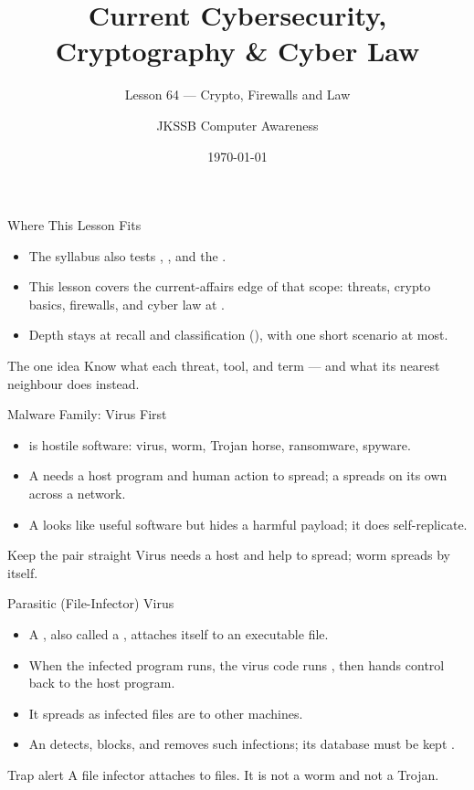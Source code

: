 \documentclass[aspectratio=169]{beamer}
\title{Current Cybersecurity, Cryptography \& Cyber Law}
\subtitle{Lesson 64 --- Crypto, Firewalls and Law}
\author{JKSSB Computer Awareness}
\date{\today}
\begin{document}
\frame{\titlepage}

\begin{frame}{Where This Lesson Fits}
  \begin{itemize}
    \item The syllabus also tests ,
      , and the .
    \item This lesson covers the current-affairs edge of that scope: threats,
      crypto basics, firewalls, and cyber law at .
    \item Depth stays at recall and classification (), with one
      short scenario at most.
  \end{itemize}
  \begin{block}{The one idea}
    Know what each threat, tool, and term  --- and what its nearest
    neighbour does instead.
  \end{block}
\end{frame}

\begin{frame}{Malware Family: Virus First}
  \begin{itemize}
    \item {} is hostile software: virus, worm, Trojan horse,
      ransomware, spyware.
    \item A  needs a host program and human action to spread; a
       spreads on its own across a network.
    \item A  looks like useful software but hides a harmful
      payload; it does  self-replicate.
  \end{itemize}
  \begin{block}{Keep the pair straight}
    Virus needs a host and help to spread; worm spreads by itself.
  \end{block}
\end{frame}

\begin{frame}{Parasitic (File-Infector) Virus}
  \begin{itemize}
    \item A , also called a ,
      attaches itself to an executable file.
    \item When the infected program runs, the virus code runs ,
      then hands control back to the host program.
    \item It spreads as infected files are  to other
      machines.
    \item An  detects, blocks, and removes such infections;
      its database must be kept .
  \end{itemize}
  \begin{alertblock}{Trap alert}
    A file infector attaches to files. It is not a worm and not a Trojan.
  \end{alertblock}
\end{frame}
\end{document}
